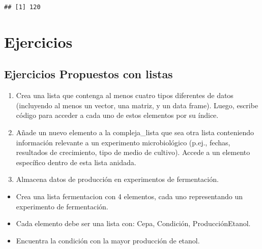 \documentclass[
]{book}
\newenvironment{Shaded}{\begin{snugshade}}{\end{snugshade}}
\newcommand{\CommentTok}[1]{\textcolor[rgb]{0.56,0.35,0.01}{\textit{#1}}}
\newcommand{\ControlFlowTok}[1]{\textcolor[rgb]{0.13,0.29,0.53}{\textbf{#1}}}
\newcommand{\FunctionTok}[1]{\textcolor[rgb]{0.13,0.29,0.53}{\textbf{#1}}}
\newcommand{\NormalTok}[1]{#1}
\newcommand{\OtherTok}[1]{\textcolor[rgb]{0.56,0.35,0.01}{#1}}
\newcommand{\SpecialCharTok}[1]{\textcolor[rgb]{0.81,0.36,0.00}{\textbf{#1}}}
\providecommand{\tightlist}{%
  \setlength{\itemsep}{0pt}\setlength{\parskip}{0pt}}
\begin{document}
\begin{Shaded}
\end{Shaded}

\begin{verbatim}
## [1] 120
\end{verbatim}

\section{Ejercicios}\label{ejercicios-2}

\subsection{Ejercicios Propuestos con listas}\label{ejercicios-propuestos-con-listas}

\begin{enumerate}
\def\labelenumi{\arabic{enumi}.}
\item
  Crea una lista que contenga al menos cuatro tipos diferentes de datos (incluyendo al menos un vector, una matriz, y un data frame). Luego, escribe código para acceder a cada uno de estos elementos por su índice.
\item
  Añade un nuevo elemento a la compleja\_lista que sea otra lista conteniendo información relevante a un experimento microbiológico (p.ej., fechas, resultados de crecimiento, tipo de medio de cultivo). Accede a un elemento específico dentro de esta lista anidada.
\item
  Almacena datos de producción en experimentos de fermentación.
\end{enumerate}

\begin{itemize}
\tightlist
\item
  Crea una lista fermentacion con 4 elementos, cada uno representando un experimento de fermentación.
\item
  Cada elemento debe ser una lista con: Cepa, Condición, ProducciónEtanol.
\item
  Encuentra la condición con la mayor producción de etanol.
\end{itemize}
\end{document}
